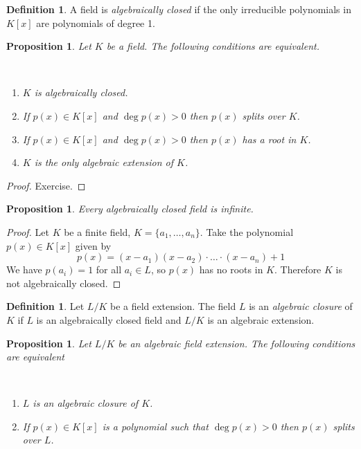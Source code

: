 \documentclass[12pt, letterpaper, oneside]{article}
\theoremstyle{plain}
\newtheorem{proposition}[theorem]{Proposition}
\theoremstyle{definition}
\newtheorem{definition}[theorem]{Definition}
\newcommand{\benu}{\begin{enumerate}}
\newcommand{\eenu}{\end{enumerate}}
\newcommand{\vs}{\vskip 5mm}
\newcommand{\isep}[1][0]{\setlength{\itemsep}{#1 mm}}
\begin{document}
\begin{definition}
A field  is \emph{algebraically closed} if the only irreducible polynomials 
in  $K[x]$ are polynomials of degree 1. 
\end{definition}

\vs\vs


\begin{proposition}
\label{PROP_ALGCLOSEDPROPS}
Let $K$ be a field. The following conditions are equivalent. \ 

\vskip -13mm

\ 
\benu
\isep[0]
\item[(i)] $K$ is algebraically closed.
\item[(ii)] If $p(x)\in K[x]$ and $\deg p(x)> 0$ then $p(x)$ splits over $K$. 
\item[(iii)] If $p(x)\in K[x]$ and $\deg p(x)>0$ then $p(x)$ has a root in $K$. 
\item[(iv)] $K$ is the only algebraic extension of $K$.
\eenu

\end{proposition}


\vs

\begin{proof}
Exercise. 
\end{proof}



\vs\vs

\begin{proposition}
Every algebraically closed field is infinite. 
\end{proposition}


\vs

\begin{proof}
Let $K$ be a finite field, $K= \{a_{1}, \dots, a_{n}\}$. Take the polynomial $p(x)\in K[x]$ given by
$$p(x) = (x-a_{1})(x-a_{2})\cdot {\dots} \cdot (x-a_{n}) +1$$
We have $p(a_{i}) = 1$ for all $a_{i}\in L$, so $p(x)$ has no roots in $K$. Therefore 
$K$ is not algebraically closed.  
\end{proof}


\vs\vs\vs


\begin{definition}
Let $L/K$ be a field extension. The field $L$ is an \emph{algebraic closure} of $K$
if $L$ is an algebraically closed field and $L/K$ is an algebraic extension. 
\end{definition}


\vs\vs\vs


\begin{proposition}
Let $L/K$ be an algebraic field extension. The following conditions are equivalent

\vskip -13mm

\ 
\benu
\item[(i)] $L$ is an algebraic closure of $K$.
\item[(ii)] If $p(x)\in K[x]$ is a polynomial such that $\deg p(x) >0$ then $p(x)$ splits
over $L$.   
\eenu
 
\end{proposition}
\end{document}

